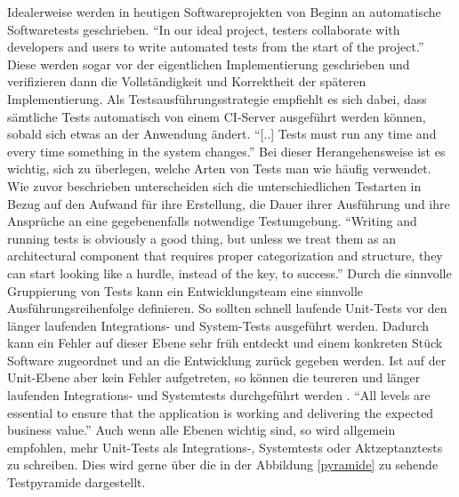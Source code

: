 Idealerweise werden in heutigen Softwareprojekten von Beginn an automatische Softwaretests geschrieben. "`In our ideal project, testers collaborate with developers and users to write automated tests from the start of the project."' \citep[S.][S. 83]{HumFar10} Diese werden sogar vor der eigentlichen Implementierung geschrieben und verifizieren dann die Vollständigkeit und Korrektheit der späteren Implementierung. Als Testsausführungsstrategie empfiehlt es sich dabei, dass sämtliche Tests automatisch von einem \ac{CI}-Server ausgeführt werden können, sobald sich etwas an der Anwendung ändert. \citep[Vgl.][S. 83]{HumFar10} "`[..] Tests must run any time and every time something in the system changes."' \citep[S.][S. 131]{DuvMatAnd07} Bei dieser Herangehensweise ist es wichtig, sich zu überlegen, welche Arten von Tests man wie häufig verwendet. Wie zuvor beschrieben unterscheiden sich die unterschiedlichen Testarten in Bezug auf den Aufwand für ihre Erstellung, die Dauer ihrer Ausführung und ihre Ansprüche an eine gegebenenfalls notwendige Testumgebung. "`Writing and running tests is obviously a good thing, but unless we treat them as an architectural component that requires proper categorization and structure, they can start looking like a hurdle, instead of the key, to success."' \citep[S.][S. 138]{DuvMatAnd07} Durch die sinnvolle Gruppierung von Tests kann ein Entwicklungsteam eine sinnvolle Ausführungsreihenfolge definieren. So sollten schnell laufende Unit-Tests vor den länger laufenden Integrations- und System-Tests ausgeführt werden. Dadurch kann ein Fehler auf dieser Ebene sehr früh entdeckt und einem konkreten Stück Software zugeordnet und an die Entwicklung zurück gegeben werden. Ist auf der Unit-Ebene aber kein Fehler aufgetreten, so können die teureren und länger laufenden Integrations- und Systemtests durchgeführt werden \citep[Vgl.][S. 138]{DuvMatAnd07}. "`All levels are essential to ensure that the application is working and delivering the expected business value."' \citep[S.][S. 178]{HumFar10} Auch wenn alle Ebenen wichtig sind, so wird allgemein empfohlen, mehr Unit-Tests als Integrations-, Systemtests oder Aktzeptanztests zu schreiben. Dies wird gerne über die in der Abbildung \ref{pyramide} zu sehende Testpyramide dargestellt.

